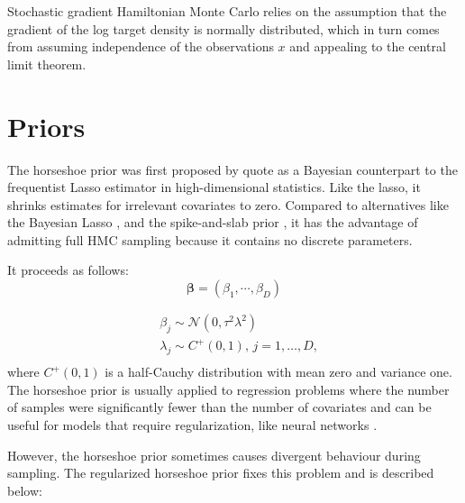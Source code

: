 \documentclass[12pt]{report}
\begin{document}
Stochastic gradient Hamiltonian Monte Carlo \cite{chen2014stochastic}
relies on the assumption that the gradient of the log target density is normally distributed, which in turn comes from assuming independence of the observations $x$ and appealing to the central limit theorem.



\section{Priors}

The horseshoe prior was first proposed by quote as a Bayesian counterpart to the frequentist Lasso estimator in high-dimensional statistics. Like the lasso, it shrinks estimates for irrelevant covariates to zero. Compared to alternatives like the Bayesian Lasso \cite{park2008bayesian},  and the spike-and-slab prior \cite{mitchell1988bayesian}, it has the advantage of admitting full HMC sampling because it contains no discrete parameters.

It proceeds as follows: 
\[ \mathbf{\beta} = (\beta_1,\cdots,\beta_D)\]

\begin{align*}
 &\beta_j \sim \mathcal{N}(0,\tau^2\lambda^2) \\
 &\lambda_j \sim C^+(0,1),\, j = 1,\dots , D, \\
\end{align*}
where $C^+(0,1)$ is a half-Cauchy distribution with mean zero and variance one. The horseshoe prior is usually applied to regression problems where the number of samples were significantly fewer than the number of covariates and can be useful for models that require regularization, like neural networks \cite{ghosh2017model}.

However, the horseshoe prior sometimes causes divergent behaviour during sampling. The regularized horseshoe prior \cite{piironen2017sparsity} fixes this problem and is described below:
\end{document}
